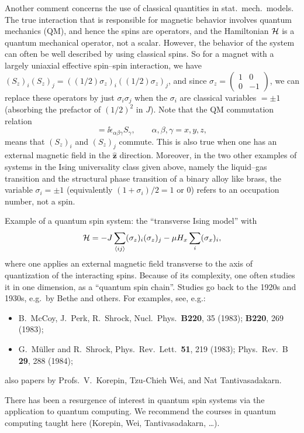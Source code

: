 Another comment concerns the use of classical quantities in stat.\ mech.\ models. The
true interaction that is responsible for magnetic behavior involves quantum mechanics
(QM), and hence the spins are operators, and the Hamiltonian $\mathcal{H}$ is a quantum
mechanical operator, not a scalar. However, the behavior of the system can often be well
described by using classical spins. So for a magnet with a largely uniaxial effective
spin--spin interaction, we have
$(S_z)_i(S_z)_j = ((1/2)\sigma_z)_i((1/2)\sigma_z)_j$, and since
$\sigma_z = \left(\begin{smallmatrix}1&0\\0&-1\end{smallmatrix}\right)$, we can replace
these operators by just $\sigma_i\sigma_j$ when the $\sigma_i$ are classical variables
$=\pm 1$ (absorbing the prefactor of $(1/2)^2$ in $J$). Note that the QM commutation
relation
\begin{equation}
  [S_\alpha,S_\beta] = \ii\epsilon_{\alpha\beta\gamma}S_\gamma,\qquad
  \alpha,\beta,\gamma = x,y,z,
\end{equation}
means that $(S_z)_i$ and $(S_z)_j$ commute. This is also true when one has an external
magnetic field in the $\hat{\mathbf{z}}$ direction. Moreover, in the two other examples
of systems in the Ising universality class given above, namely the liquid--gas transition
and the structural phase transition of a binary alloy like brass, the variable
$\sigma_i = \pm 1$ (equivalently $(1+\sigma_i)/2 = 1$ or $0$) refers to an
occupation number, not a spin.

Example of a quantum spin system: the ``transverse Ising model'' with
\begin{equation}
  \mathcal{H} = -J\sum_{\langle ij\rangle}(\sigma_z)_i(\sigma_z)_j - \mu H_x\sum_i(\sigma_x)_i ,
\end{equation}
where one applies an external magnetic field transverse to the axis of quantization of
the interacting spins. Because of its complexity, one often studies it in one dimension,
as a ``quantum spin chain''. Studies go back to the 1920s and 1930s, e.g.\ by Bethe and
others. For examples, see, e.g.:
\begin{itemize}
  \item B.~McCoy, J.~Perk, R.~Shrock, Nucl.\ Phys.\ \textbf{B220}, 35 (1983);
    \textbf{B220}, 269 (1983);
  \item G.~M\"uller and R.~Shrock, Phys.\ Rev.\ Lett.\ \textbf{51}, 219 (1983);
    Phys.\ Rev.\ B \textbf{29}, 288 (1984);
\end{itemize}
also papers by Profs.\ V.~Korepin, Tzu-Chieh Wei, and Nat Tantivasadakarn.

There has been a resurgence of interest in quantum spin systems via the application to
quantum computing. We recommend the courses in quantum computing taught here (Korepin,
Wei, Tantivasadakarn, \ldots).

